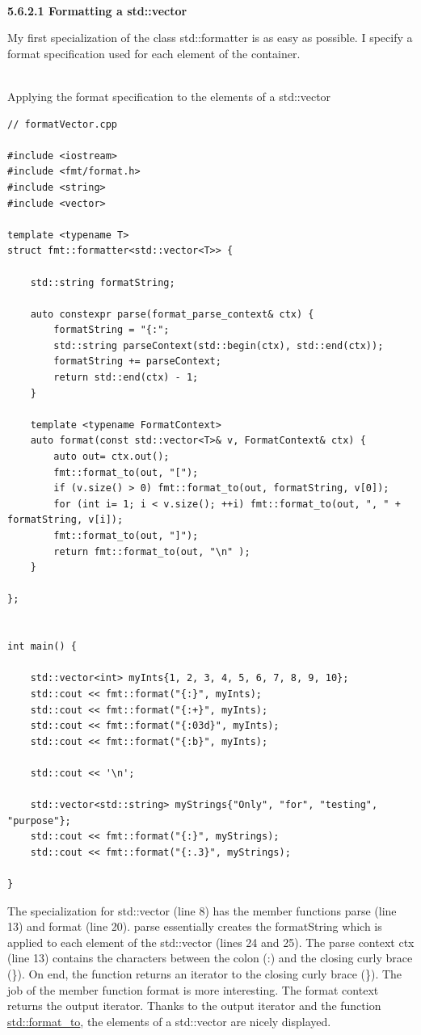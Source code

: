\hspace*{\fill} \\ %
\noindent
\textbf{5.6.2.1\hspace{0.2cm} Formatting a std::vector}

My first specialization of the class std::formatter is as easy as possible. I specify a format specification used for each element of the container.

\hspace*{\fill} \\ %
\noindent
Applying the format specification to the elements of a std::vector
\begin{lstlisting}[style=styleCXX]
// formatVector.cpp

#include <iostream>
#include <fmt/format.h>
#include <string>
#include <vector>

template <typename T>
struct fmt::formatter<std::vector<T>> {

	std::string formatString;
	
	auto constexpr parse(format_parse_context& ctx) {
		formatString = "{:";
		std::string parseContext(std::begin(ctx), std::end(ctx));
		formatString += parseContext;
		return std::end(ctx) - 1;
	}
	
	template <typename FormatContext>
	auto format(const std::vector<T>& v, FormatContext& ctx) {
		auto out= ctx.out();
		fmt::format_to(out, "[");
		if (v.size() > 0) fmt::format_to(out, formatString, v[0]);
		for (int i= 1; i < v.size(); ++i) fmt::format_to(out, ", " + formatString, v[i]);
		fmt::format_to(out, "]");
		return fmt::format_to(out, "\n" );
	}

};


int main() {

	std::vector<int> myInts{1, 2, 3, 4, 5, 6, 7, 8, 9, 10};
	std::cout << fmt::format("{:}", myInts);
	std::cout << fmt::format("{:+}", myInts);
	std::cout << fmt::format("{:03d}", myInts);
	std::cout << fmt::format("{:b}", myInts);
	
	std::cout << '\n';
	
	std::vector<std::string> myStrings{"Only", "for", "testing", "purpose"};
	std::cout << fmt::format("{:}", myStrings);
	std::cout << fmt::format("{:.3}", myStrings);

}
\end{lstlisting}

The specialization for std::vector (line 8) has the member functions parse (line 13) and format (line 20). parse essentially creates the formatString which is applied to each element of the std::vector (lines 24 and 25). The parse context ctx (line 13) contains the characters between the colon (:) and the closing curly brace (\}). On end, the function returns an iterator to the closing curly brace (\}). The job of the member function format is more interesting. The format context returns the output iterator. Thanks to the output iterator and the function \href{https://en.cppreference.com/w/cpp/utility/format/format_to}{std::format\_to}, the elements of a std::vector are nicely displayed.

